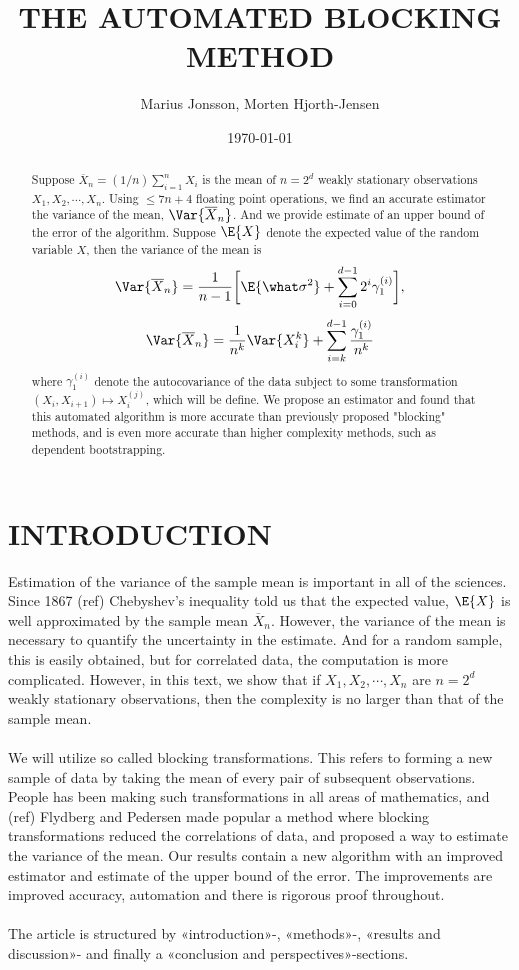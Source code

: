 \documentclass[11pt,english,a4paper]{article}
\author{\normalsize Marius Jonsson, Morten Hjorth-Jensen}
\title{\bf \uppercase{The automated blocking method}}
\date{\normalsize \today}
\begin{document}
\maketitle
\begin{abstract} \normalsize
Suppose $\overline{ X}_n = (1/n) \sum_{i=1}^{n} X_i$ is the mean of $n = 2^d$ weakly stationary observations $X_1,X_2,\cdots,X_n$. Using $\leq 7n+4$ floating point operations, we find an accurate estimator the variance of the mean, $\Var{\overline{X}_n}$. And we provide estimate of an upper bound of the error of the algorithm. Suppose $\E{X}$ denote the expected value of the random variable $X$, then the variance of the mean is
\[
\Var{\overline{X}_n} = \frac{1}{n-1} \bigg[ \E{\what \sigma^2} + \sum_{i=0}^{d-1}2^i \gamma^{(i)}_1  \bigg],
\]
\[
\Var{\overline{X}_n} =  \frac{1 }{n^{k}}\Var{X^k_i} + \sum_{i=k}^{d-1} \frac{ \gamma^{(i)}_1 }{n^{k}}
\]
where $\gamma_1^{(i)}$ denote the autocovariance of the data subject to some 
transformation $( X_i , X_{i+1} ) \mapsto X_i^{(j)}$, which will be define. We propose 
an estimator and found that this automated algorithm is more accurate than 
previously proposed "blocking" methods, and is even more accurate than higher 
complexity methods, such as dependent bootstrapping.
\end{abstract}
\section*{\uppercase{Introduction}}
Estimation of the variance of the sample mean is important in all of the sciences. Since 1867 (ref) Chebyshev's inequality told us that the expected value, $\E{X}$ is well approximated by the sample mean $\overline{X}_n$. However, the variance of the mean is necessary to quantify the uncertainty in the estimate. And for a random sample, this is easily obtained, but for correlated data, the computation is more complicated. However, in this text, we show that if $X_1,X_2,\cdots,X_n$ are $n = 2^d$ weakly stationary observations, then the complexity is no larger than that of the sample mean.\\
\\
We will utilize so called blocking transformations. This refers to forming a new sample of data by taking the mean of every pair of subsequent observations. People has been making such transformations in all areas of mathematics, and (ref) Flydberg and Pedersen made popular a method where blocking transformations reduced the correlations of data, and proposed a way to estimate the variance of the mean. Our results contain a new algorithm with an improved estimator and estimate of the upper bound of the error. The improvements are improved accuracy, automation and there is rigorous proof throughout.\\
\\
The article is structured by «introduction»-, «methods»-, «results and discussion»- and finally a «conclusion and perspectives»-sections.
\end{document}
